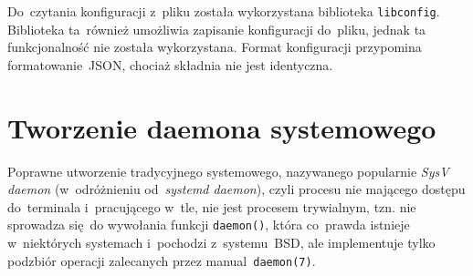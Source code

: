 \documentclass[thesis]{subfiles}
\begin{document}
Do~czytania konfiguracji z~pliku została wykorzystana biblioteka \texttt{libconfig}. Biblioteka ta~również umożliwia zapisanie konfiguracji do~pliku, jednak ta funkcjonalność nie została wykorzystana. Format konfiguracji przypomina formatowanie~JSON, chociaż składnia nie jest identyczna.


\section{Tworzenie daemona systemowego}

Poprawne utworzenie tradycyjnego   systemowego, nazywanego popularnie \emph{SysV daemon} (w~odróżnieniu od~\emph{systemd daemon}), czyli procesu nie mającego dostępu do~terminala i~pracującego w~tle, nie jest procesem trywialnym, tzn. nie sprowadza się~do wywołania funkcji \texttt{daemon()}, która co~prawda istnieje w~niektórych systemach i~pochodzi z~systemu~BSD, ale implementuje tylko podzbiór operacji zalecanych przez manual~\texttt{daemon(7)}.
\end{document}

